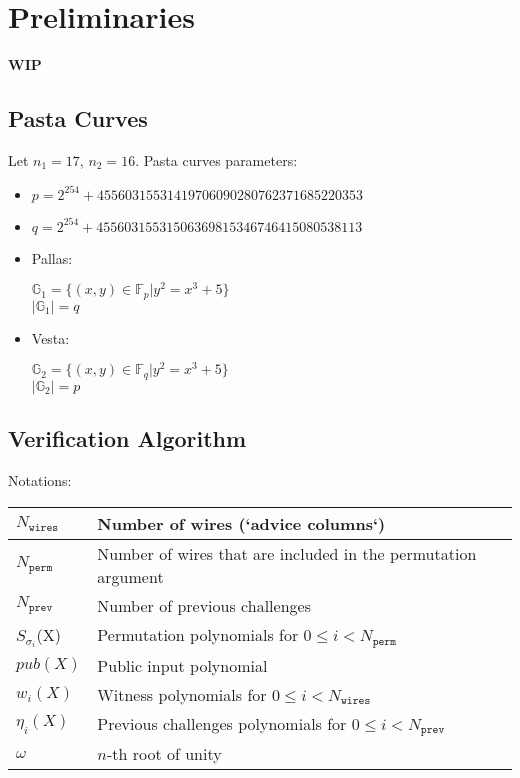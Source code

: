 \section{Preliminaries}
\label{section:preliminaries}
\textbf{WIP}
\subsection{Pasta Curves}

Let $n_1 = 17$, $n_2 = 16$.
Pasta curves parameters:
\begin{itemize}
	\item $p = 2^{254} + 45560315531419706090280762371685220353$
	\item $q = 2^{254} + 45560315531506369815346746415080538113$
	\item Pallas:
		\begin{center}
			$\mathbb{G}_1 = \{ (x, y) \in \mathbb{F}_p | y^2 = x^3 + 5 \}$ \\
			$|\mathbb{G}_1| = q$
		\end{center}
	\item Vesta:
		\begin{center}
			$\mathbb{G}_2 = \{ (x, y) \in \mathbb{F}_q | y^2 = x^3 + 5 \}$ \\
			$|\mathbb{G}_2| = p$
		\end{center}
\end{itemize}

\subsection{Verification Algorithm}

Notations:

\begin{center}
\begin{table}[H]
\begin{tabular}{| l | l |}
 	\hline
	$N_{\texttt{wires}}$ & Number of wires (`advice columns`) \\
	\hline
	$N_{\texttt{perm}}$ & Number of wires that are included in the permutation argument \\
	\hline
	$N_{\texttt{prev}}$ & Number of previous challenges \\
	\hline
	$S_{\sigma_i}$(X) & Permutation polynomials for $0 \leq i < N_{\texttt{perm}}$ \\
	\hline
	$pub(X)$ & Public input polynomial \\
	\hline
	$w_i(X)$ & Witness polynomials for $0 \leq i < N_{\texttt{wires}}$\\
	\hline
	$\eta_i(X)$ & Previous challenges polynomials for $0 \leq i < N_{\texttt{prev}}$\\
	\hline
	$\omega$ & $n$-th root of unity \\
	\hline
\end{tabular}
\end{table}
\end{center}

